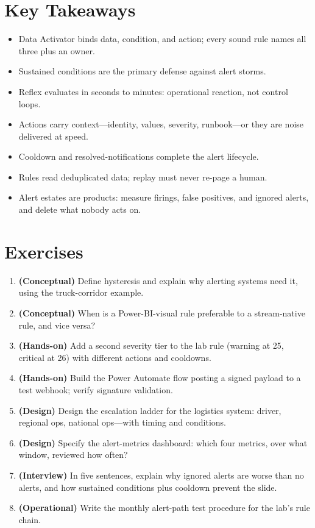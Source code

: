 \section*{Key Takeaways}
\begin{itemize}
    \item Data Activator binds data, condition, and action; every sound rule names all three plus an owner.
    \item Sustained conditions are the primary defense against alert storms.
    \item Reflex evaluates in seconds to minutes: operational reaction, not control loops.
    \item Actions carry context---identity, values, severity, runbook---or they are noise delivered at speed.
    \item Cooldown and resolved-notifications complete the alert lifecycle.
    \item Rules read deduplicated data; replay must never re-page a human.
    \item Alert estates are products: measure firings, false positives, and ignored alerts, and delete what nobody acts on.
\end{itemize}

\section{Exercises}
\begin{enumerate}
    \item \textbf{(Conceptual)} Define hysteresis and explain why alerting systems need it, using the truck-corridor example.
    \item \textbf{(Conceptual)} When is a Power-BI-visual rule preferable to a stream-native rule, and vice versa?
    \item \textbf{(Hands-on)} Add a second severity tier to the lab rule (warning at 25, critical at 26) with different actions and cooldowns.
    \item \textbf{(Hands-on)} Build the Power Automate flow posting a signed payload to a test webhook; verify signature validation.
    \item \textbf{(Design)} Design the escalation ladder for the logistics system: driver, regional ops, national ops---with timing and conditions.
    \item \textbf{(Design)} Specify the alert-metrics dashboard: which four metrics, over what window, reviewed how often?
    \item \textbf{(Interview)} In five sentences, explain why ignored alerts are worse than no alerts, and how sustained conditions plus cooldown prevent the slide.
    \item \textbf{(Operational)} Write the monthly alert-path test procedure for the lab's rule chain.
\end{enumerate}

